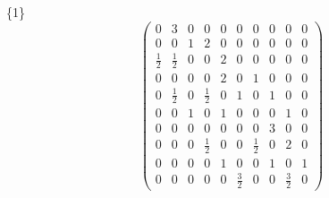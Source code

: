 \documentclass[12pt,reqno]{amsart}
\begin{document}
\Large
\{1\}                             $$ \begin{pmatrix} 
         0 & 3 & 0 & 0 & 0 & 0 & 0 & 0 & 0 & 0 \\[6pt]
         0 & 0 & 1 & 2 & 0 & 0 & 0 & 0 & 0 & 0 \\[6pt]
 \frac{1}{2} &  \frac{1}{2} & 0 & 0 & 2 & 0 & 0 & 0 & 0 & 0 

  \\[6pt]

         0 & 0 & 0 & 0 & 2 & 0 & 1 & 0 & 0 & 0 \\[6pt]
0 &  \frac{1}{2} & 0 &  \frac{1}{2} & 0 & 1 & 0 & 1 & 0 & 0 

  \\[6pt]

         0 & 0 & 1 & 0 & 1 & 0 & 0 & 0 & 1 & 0 \\[6pt]
         0 & 0 & 0 & 0 & 0 & 0 & 0 & 3 & 0 & 0 \\[6pt]
0 & 0 & 0 &  \frac{1}{2} & 0 & 0 &  \frac{1}{2} & 0 & 2 & 0 

  \\[6pt]

         0 & 0 & 0 & 0 & 1 & 0 & 0 & 1 & 0 & 1 \\[6pt]
0 & 0 & 0 & 0 & 0 &  \frac{3}{2} & 0 & 0 &  \frac{3}{2} & 0
                              \end{pmatrix} $$ 
\end{document}
